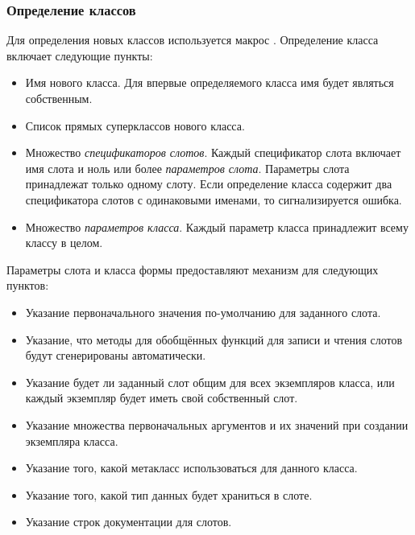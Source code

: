 \subsubsection{Определение классов}

Для определения новых классов используется макрос .
Определение класса включает следующие пункты:
\begin{itemize}
\item Имя нового класса. Для впервые определяемого класса имя будет являться
  собственным.

\item Список прямых суперклассов нового класса.

\item Множество \emph{спецификаторов слотов}. Каждый спецификатор слота включает
  имя слота и ноль или более \emph{параметров слота}. Параметры слота
  принадлежат только одному слоту. Если определение класса содержит два
  спецификатора слотов с одинаковыми именами, то сигнализируется ошибка.

\item Множество \emph{параметров класса}. Каждый параметр класса принадлежит
  всему классу в целом.
\end{itemize}

Параметры слота и класса формы  предоставляют механизм для
следующих пунктов:
\begin{itemize}
\item Указание первоначального значения по-умолчанию для заданного слота.

\item Указание, что методы для обобщённых функций для записи и чтения слотов
  будут сгенерированы автоматически.

\item Указание будет ли заданный слот общим для всех экземпляров класса, или
  каждый экземпляр будет иметь свой собственный слот.

\item Указание множества первоначальных аргументов и их значений при создании
  экземпляра класса.

\item Указание того, какой метакласс использоваться для данного класса.

\item Указание того, какой тип данных будет храниться в слоте.

\item Указание строк документации для слотов.
\end{itemize}


